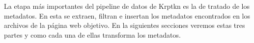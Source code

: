 La etapa más importantes del pipeline de datos de Krptkn es la de tratado de los metadatos. En esta se extraen, filtran e insertan los metadatos encontrados en los archivos de la página web objetivo. En la siguientes secciones veremos estas tres partes y como cada una de ellas transforma los metadatos.